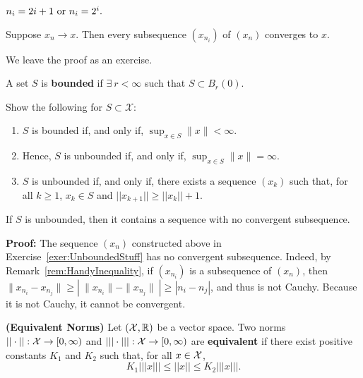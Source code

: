 \begin{example} $n_i = 2i + 1\textnormal{ or } n_i = 2^i.$
    
\end{example}

\begin{lem}
\label{lem:SubSequencesConverge}
 Suppose $x_n\to x$. Then every subsequence $(x_{n_i})$ of $(x_n)$ converges to $x$.
\end{lem}

We leave the proof as an exercise. 

\begin{definition} A set $S$ is \textbf{ bounded} if $\exists~ r < \infty$ such that $S \subset B_r(0)$.
\end{definition}

\begin{exercise} 
\label{exer:UnboundedStuff}
Show the following for $S\subset \mathcal{X}$:
\begin{enumerate}
    \item $S$ is bounded if, and only if, $\sup_{x\in S} \| x \| < \infty$.
     \item Hence, $S$ is unbounded if, and only if, $\sup_{x\in S} \| x \| = \infty$.
    \item $S$ is unbounded if, and only if, there exists a sequence $(x_k)$ such that, for all $k\ge 1$, $x_k\in S$ and $||x_{k+1}||\ge ||x_k|| + 1$.
\end{enumerate}
\end{exercise}

\begin{lem} If $S$ is unbounded, then it contains a sequence with no convergent subsequence.
\end{lem}

\textbf{Proof:} The sequence $(x_n)$ constructed above in Exercise~\ref{exer:UnboundedStuff} has no convergent subsequence. Indeed, by Remark~\ref{rem:HandyInequality}, if $(x_{n_i})$ is a subsequence of $(x_n)$, then $\| x_{n_i} -x_{n_j}\| \ge | ~\| x_{n_i}\| - \|x_{n_j}\|~| \ge |n_i - n_j|$, and thus is not Cauchy. Because it is not Cauchy, it cannot be convergent.

\Qed 

\begin{definition} \textbf{(Equivalent Norms)} Let $({\cal X}, \mathbb R)$ be a vector space. Two norms $||\cdot||:{\cal X} \to[0, \infty)$ and $|||\cdot|||:{\cal X} \to [0, \infty)$ are \textbf{equivalent} if there exist positive constants $K_1$ and $K_2$ such that, for all $x\in {\cal X}$,
    $$K_1 |||x||| \le ||x|| \le K_2 |||x|||. $$
\end{definition} 

